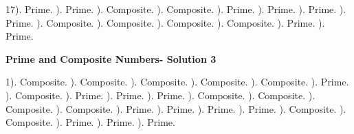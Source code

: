 \documentclass{article}%
\begin{document}
17). Prime.%
). Prime.%
). Composite.%
). Composite.%
). Prime.%
). Prime.%
). Prime.%
). Prime.%
). Composite.%
). Composite.%
). Composite.%
). Composite.%
). Prime.%
). Prime.%
\newline%
\newpage%
\large%
\begin{center}%
\textbf{Prime and Composite Numbers- Solution 3}%
\newline%
\end{center} \normalsize%
1). Composite.%
). Composite.%
). Composite.%
). Composite.%
). Composite.%
). Prime.%
). Composite.%
). Prime.%
). Prime.%
). Prime.%
). Composite.%
). Composite.%
). Composite.%
). Composite.%
). Prime.%
). Prime.%
). Prime.%
). Prime.%
). Composite.%
). Composite.%
). Prime.%
). Prime.%
). Prime.%
\newline%
\end{document}
